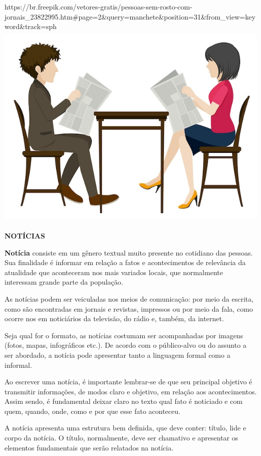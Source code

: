 \begin{itemize}
{{{\begin{itemize}
\begin{itemize}
\begin{itemize}
https://br.freepik.com/vetores-gratis/pessoas-sem-rosto-com-jornais\_23822995.htm\#page=2\&query=manchete\&position=31\&from\_view=keyword\&track=sph\includegraphics[width=5.41667in,height=3.95422in]{media/image20.jpeg}

\textbf{NOTÍCIAS}

\textbf{Notícia} consiste em um gênero textual muito presente no
cotidiano das pessoas. Sua finalidade é informar em relação a fatos e
acontecimentos de relevância da atualidade que aconteceram nos mais
variados locais, que normalmente interessam grande parte da população.

As notícias podem ser veiculadas nos meios de comunicação: por meio da
escrita, como são encontradas em jornais e revistas, impressos ou por
meio da fala, como ocorre nos em noticiários da televisão, do rádio e,
também, da internet.

Seja qual for o formato, as notícias costumam ser acompanhadas por
imagens (fotos, mapas, infográficos etc.). De acordo com o público-alvo
ou do assunto a ser abordado, a notícia pode apresentar tanto a
linguagem formal como a informal.

Ao escrever uma notícia, é importante lembrar-se de que seu principal
objetivo é transmitir informações, de modos claro e objetivo, em relação
aos acontecimentos. Assim sendo, é fundamental deixar claro no texto
qual fato é noticiado e com quem, quando, onde, como e por que esse fato
aconteceu.

A notícia apresenta uma estrutura bem definida, que deve conter: título,
lide e corpo da notícia. O título, normalmente, deve ser chamativo e
apresentar os elementos fundamentais que serão relatados na notícia.


\end{itemize}
\end{itemize}
\end{itemize}}}}
\end{itemize}
